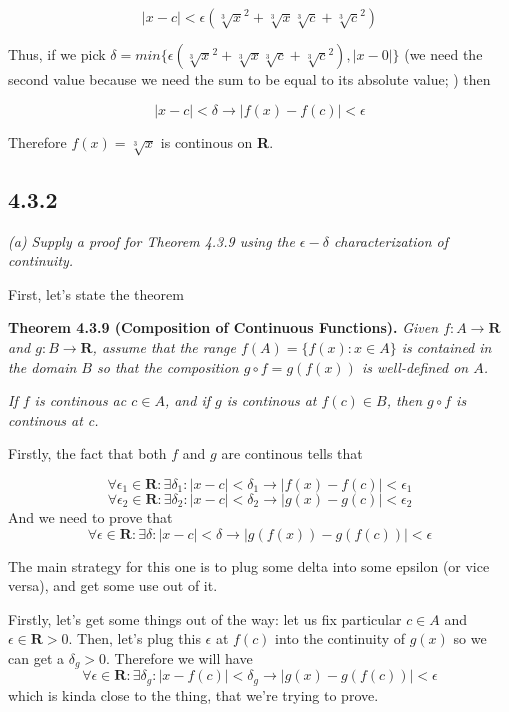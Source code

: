 \documentclass[11pt,oneside,titlepage]{book}
\begin{document}
$$ |x - c| < \epsilon(\sqrt[3]{x}^2 + \sqrt[3]{x}\sqrt[3]{c}
+ \sqrt[3]{c} ^ 2) $$

Thus, if we pick $\delta = min\{\epsilon(\sqrt[3]{x}^2 + \sqrt[3]{x}\sqrt[3]{c}
+ \sqrt[3]{c} ^ 2), |x - 0|\}$ (we need the second value
because we need the sum to be equal to its absolute value; ) then

$$|x - c| < \delta \to |f(x)  - f(c)| < \epsilon$$

Therefore $f(x) = \sqrt[3]{x}$ is continous on \textbf{R}.

\subsection*{4.3.2}

\textit{(a) Supply a proof for Theorem 4.3.9 using the $\epsilon-\delta$
  characterization of continuity.}

First, let's state the theorem

\textbf{Theorem 4.3.9 (Composition of Continuous Functions).} \textit{Given
  $f: A \to \textbf{R}$ and $g: B \to \textbf{R}$, assume that the range
  $f(A) =\{f(x): x \in A\}$ is contained in the domain $B$ so that the
  composition $g \circ f = g(f(x)) $ is well-defined on $A$. }

\textit{If $f$ is continous ac $c \in A$, and if $g$ is continous at
  $f(c) \in B$, then $g \circ f$ is continous at c.}

Firstly, the fact that both $f$ and $g$ are continous tells that

$$\forall \epsilon_1 \in \textbf{R}: \exists \delta_1:  |x - c| < \delta_1 \to
|f(x) - f(c)| < \epsilon_1$$
$$\forall \epsilon_2 \in \textbf{R}: \exists \delta_2: |x - c| < \delta_2 \to
|g(x) - g (c)| < \epsilon_2$$
And we need to prove that
$$\forall \epsilon \in \textbf{R}: \exists \delta: |x - c| < \delta \to
|g(f(x)) - g (f(c))| < \epsilon$$


The main strategy for this one is to plug some delta into some epsilon (or
vice versa), and get some use out of it.

Firstly, let's get some things out of the way: let us fix particular $c \in A$
and $\epsilon \in \textbf{R} > 0$. Then, let's plug this $\epsilon$ at $f(c)$
into the continuity of $g(x)$ so we can get a $\delta_g > 0$. Therefore
we will have
$$ \forall \epsilon \in \textbf{R}: \exists \delta_g: |x - f(c)| < \delta_g
\to |g(x) - g(f(c))| < \epsilon $$
which is kinda close to the thing, that we're trying to prove.
\end{document}
